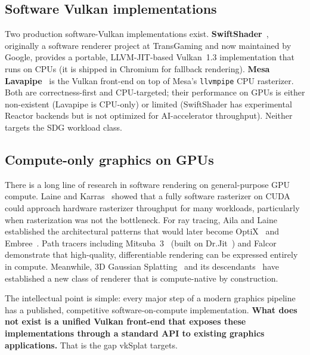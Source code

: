 \documentclass[10pt,journal]{IEEEtran}
\begin{document}
\subsection{Software Vulkan implementations}

Two production software-Vulkan implementations exist.
\textbf{SwiftShader}~\cite{swiftshader}, originally a software renderer
project at TransGaming and now maintained by Google, provides a portable,
LLVM-JIT-based Vulkan~1.3 implementation that runs on CPUs (it is shipped
in Chromium for fallback rendering). \textbf{Mesa Lavapipe}~\cite{mesa-lavapipe}
is the Vulkan front-end on top of Mesa's \texttt{llvmpipe} CPU rasterizer.
Both are correctness-first and CPU-targeted; their performance on GPUs is
either non-existent (Lavapipe is CPU-only) or limited (SwiftShader has
experimental Reactor backends but is not optimized for AI-accelerator
throughput). Neither targets the SDG workload class.

\subsection{Compute-only graphics on GPUs}

There is a long line of research in software rendering on
general-purpose GPU compute. Laine and
Karras~\cite{laine2011software} showed that a fully software rasterizer
on CUDA could approach hardware rasterizer throughput for many workloads,
particularly when rasterization was not the bottleneck.
For ray tracing, Aila and Laine~\cite{aila2009understanding} established
the architectural patterns that would later become OptiX~\cite{parker2010optix}
and Embree~\cite{wald2014embree}. Path tracers including
Mitsuba~3~\cite{jakob2022mitsuba3} (built on Dr.Jit~\cite{jakob2022drjit})
and Falcor~\cite{benty2020falcor} demonstrate that high-quality,
differentiable rendering can be expressed entirely in compute.
Meanwhile, 3D Gaussian Splatting~\cite{kerbl20233dgs} and its
descendants~\cite{yu2024mip,huang20242dgs} have established a new class
of renderer that is compute-native by construction.

The intellectual point is simple: every major step of a modern graphics
pipeline has a published, competitive software-on-compute implementation.
\textbf{What does not exist is a unified Vulkan front-end that exposes
these implementations through a standard API to existing graphics
applications.} That is the gap vkSplat targets.

\end{document}
